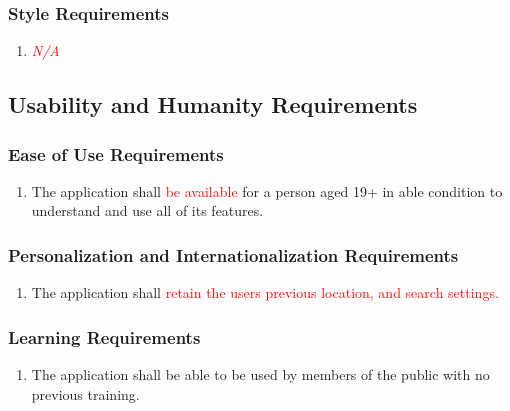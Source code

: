 \documentclass[]{article}
\begin{document}
\subsubsection{Style Requirements}
\label{ssub:style_requirements}
\begin{enumerate}[{LF}1. ]
	\item \textcolor{red}{\emph{N/A}}
\end{enumerate}


\subsection{Usability and Humanity Requirements}
\label{sub:usability_and_humanity_requirements}

\subsubsection{Ease of Use Requirements}
\label{ssub:ease_of_use_requirements}
\begin{enumerate}[{UH}1. ]
	\item The application shall \textcolor{red}{be available} for a person aged 19+ in able condition to understand and use all of its features.
\end{enumerate}

\subsubsection{Personalization and Internationalization Requirements}
\label{ssub:personalization_and_internationalization_requirements}
\begin{enumerate}[{UH}1. ]
	\item The application shall \textcolor{red}{retain the users previous location, and search settings.}
\end{enumerate}

\subsubsection{Learning Requirements}
\label{ssub:learning_requirements}
\begin{enumerate}[{UH}1. ]
	\item The application shall be able to be used by members of the public with no previous training.
\end{enumerate}
\end{document}
